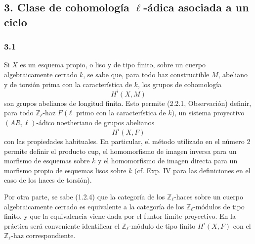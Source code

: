 \subsection*{3. Clase de cohomología \(\ell\)-ádica asociada a un ciclo}

\subsubsection*{3.1}
Si \(X\) es un esquema propio, o liso y de tipo finito, sobre un cuerpo algebraicamente cerrado \(k\), se sabe que, para todo haz constructible \(M\), abeliano y de torsión prima con la característica de \(k\), los grupos de cohomología
\[
H^i(X,M)
\]
son grupos abelianos de longitud finita. Esto permite (2.2.1, Observación) definir, para todo \(\mathbb Z_\ell\)-haz \(F\) (\(\ell\) primo con la característica de \(k\)), un sistema proyectivo \((AR,\ell)\)-ádico noetheriano de grupos abelianos
\[
H^i(X,F)
\]
con las propiedades habituales. En particular, el método utilizado en el número 2 permite definir el producto cup, el homomorfismo de imagen inversa para un morfismo de esquemas sobre \(k\) y el homomorfismo de imagen directa para un morfismo propio de esquemas lisos sobre \(k\) (cf. Exp. IV para las definiciones en el caso de los haces de torsión).

Por otra parte, se sabe (1.2.4) que la categoría de los \(\mathbb Z_\ell\)-haces sobre un cuerpo algebraicamente cerrado es equivalente a la categoría de los \(\mathbb Z_\ell\)-módulos de tipo finito, y que la equivalencia viene dada por el funtor límite proyectivo. En la práctica será conveniente identificar el \(\mathbb Z_\ell\)-módulo de tipo finito \(H^i(X,F)\) con el \(\mathbb Z_\ell\)-haz correspondiente.
